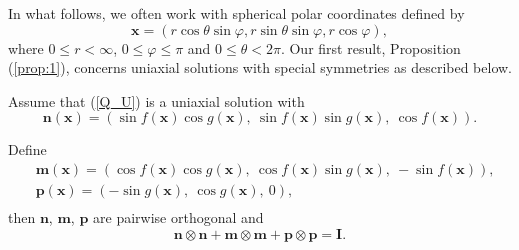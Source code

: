 \documentclass[10pt, a4paper]{article}
\newcommand\n{\mathbf{n}}
\newcommand\m{\mathbf{m}}
\newcommand\p{\mathbf{p}}
\newcommand\x{\mathbf{x}}
\begin{document}
In what follows, we often work with spherical polar coordinates defined by
\begin{equation}
\label{coord}
\x = \left( r \cos\theta \sin \varphi, r \sin\theta \sin\varphi, r \cos \varphi \right),
\end{equation}
where $0\leq r < \infty$, $0 \leq \varphi \leq \pi$ and $0\leq \theta < 2 \pi$. Our first result, Proposition (\ref{prop:1}), concerns uniaxial solutions with special symmetries as described below.

Assume that (\ref{Q_U}) is a uniaxial solution with
\begin{equation}
 \n(\x) = \left( \sin f(\x) \cos g(\x),~ \sin f(\x) \sin g(\x),~ \cos f(\x) \right).
\end{equation}

Define
\begin{equation}
\begin{aligned}
&  \m(\x) = \left( \cos f( \x) \cos g( \x),~ \cos f(\x) \sin g( \x),~ - \sin f( \x) \right), \\
&  \p(\x) = \left( - \sin g(\x),~ \cos g( \x),~ 0 \right), \\
\end{aligned}
\end{equation}
then $\n$, $\m$, $\p$ are pairwise orthogonal and
\begin{equation}
\n \otimes \n + \m \otimes \m + \p \otimes \p = \mathbf{I}.
\end{equation}
\end{document}
